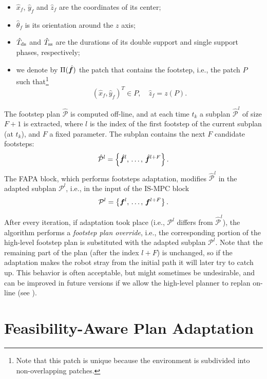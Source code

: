 \begin{itemize}
    \item $\hat x_f$, $\hat y_f$ and $\hat z_f$ are the coordinates of its center;
    \item $\hat\theta_f$ is its orientation around the $z$ axis;
    \item $\hat T_{\rm ds}$ and $\hat T_{\rm ss}$ are the durations of its  double support and single support phases, respectively;
    \item we denote by $\Pi(\hat{{\bm{f}}})$ the patch that contains the footstep, i.e., the patch $P$ such that\footnote{Note that this patch is unique because the environment is subdivided into non-overlapping patches.}
    \[
    (\hat{x}_f, \hat{y}_f)^T \in P,\quad \hat{z}_f = z(P).
    \]
\end{itemize}

The footstep plan $\mathcal{\hat P}$ is computed off-line, and at each time
$t_k$ a subplan $\mathcal{\hat P}^l$ of size $F+1$ is extracted, where $l$ is
the index of the first footstep of the current subplan (at $t_k$), and $F$ a
fixed parameter. The subplan contains the next $F$ candidate footsteps:
\begin{equation*}
\mathcal{\hat P}^l = \left\{
\hat{{\bm{f}}}^{l},\,\dots,\,\hat{{\bm{f}}}^{l+F}
\right\}.
\end{equation*}
The FAPA block, which performs footsteps adaptation, modifies
$\mathcal{\hat P}^l$ in the adapted subplan $\mathcal{P}^l$, i.e., in the input
of the IS-MPC block
\begin{equation*}
    \mathcal{P}^l = \left\{
    {\bm{f}}^{l},\,\dots,\,{\bm{f}}^{l+F}
    \right\}.
\end{equation*}

After every iteration, if adaptation took place (i.e., $\mathcal{P}^l$ differs
from $\mathcal{\hat P}^l$), the algorithm performs a {\em footstep plan
override}, i.e., the corresponding portion of the high-level footstep plan
is substituted with the adapted subplan $\mathcal{P}^l$. Note that the
remaining part of the plan (after the index $l+F$) is unchanged, so if the
adaptation makes the robot stray from the initial path it will later try to
catch up. This behavior is often acceptable, but might sometimes be undesirable,
and can be improved in future versions if we allow the high-level planner
to replan on-line (see \cite{Cipriano2023RAS}).

\section{Feasibility-Aware Plan Adaptation}
\label{sec:FAPA:FeasibilityAwarePlanAdaptation}


